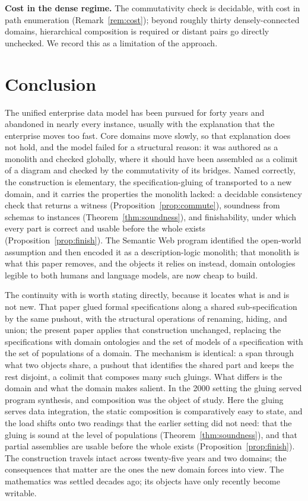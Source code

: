 \documentclass[11pt]{article}
\theoremstyle{plain}
\theoremstyle{definition}
\begin{document}
\textbf{Cost in the dense regime.} The commutativity check is decidable, with cost in path enumeration (Remark~\ref{rem:cost}); beyond roughly thirty densely-connected domains, hierarchical composition is required or distant pairs go directly unchecked. We record this as a limitation of the approach.

\section{Conclusion}

The unified enterprise data model has been pursued for forty years and abandoned in nearly every instance, usually with the explanation that the enterprise moves too fast. Core domains move slowly, so that explanation does not hold, and the model failed for a structural reason: it was authored as a monolith and checked globally, where it should have been assembled as a colimit of a diagram and checked by the commutativity of its bridges. Named correctly, the construction is elementary, the specification-gluing of \cite{cpw2000,pwc2005} transported to a new domain, and it carries the properties the monolith lacked: a decidable consistency check that returns a witness (Proposition~\ref{prop:commute}), soundness from schemas to instances (Theorem~\ref{thm:soundness}), and finishability, under which every part is correct and usable before the whole exists (Proposition~\ref{prop:finish}). The Semantic Web program identified the open-world assumption and then encoded it as a description-logic monolith; that monolith is what this paper removes, and the objects it relies on instead, domain ontologies legible to both humans and language models, are now cheap to build.

The continuity with \cite{cpw2000} is worth stating directly, because it locates what is and is not new. That paper glued formal specifications along a shared sub-specification by the same pushout, with the structural operations of renaming, hiding, and union; the present paper applies that construction unchanged, replacing the specifications with domain ontologies and the set of models of a specification with the set of populations of a domain. The mechanism is identical: a span through what two objects share, a pushout that identifies the shared part and keeps the rest disjoint, a colimit that composes many such gluings. What differs is the domain and what the domain makes salient. In the 2000 setting the gluing served program synthesis, and composition was the object of study. Here the gluing serves data integration, the static composition is comparatively easy to state, and the load shifts onto two readings that the earlier setting did not need: that the gluing is sound at the level of populations (Theorem~\ref{thm:soundness}), and that partial assemblies are usable before the whole exists (Proposition~\ref{prop:finish}). The construction travels intact across twenty-five years and two domains; the consequences that matter are the ones the new domain forces into view. The mathematics was settled decades ago; its objects have only recently become writable.
\end{document}
